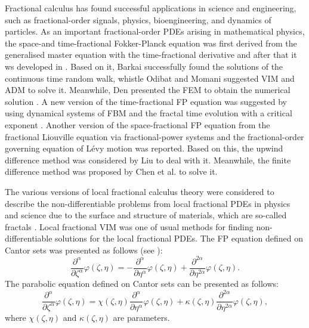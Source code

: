 \documentclass[10pt]{NSP1}
\begin{document}
Fractional calculus \cite{1,2,3,4,5,6,7,8,9} has found successful applications in science and
engineering, such as fractional-order signals, physics, bioengineering, and
dynamics of particles. As an important fractional-order PDEs arising
in mathematical physics, the space-and time-fractional Fokker-Planck
equation was first derived from the generalised master equation \cite {10} with
the time-fractional derivative and after that it ws developed in \cite {11}. Based
on it, Barkai \cite {12} successfully found the solutions of the continuous time
random walk, whistle Odibat and Momani \cite {13} suggested VIM and ADM to solve
it. Meanwhile, Den presented the FEM to obtain the numerical solution \cite {14}.
A new version of the time-fractional FP equation was suggested by using
dynamical systems of FBM \cite {15} and the fractal time evolution with a critical
exponent \cite {16}. Another version of the space-fractional FP equation from the
fractional Liouville equation via fractional-power systems \cite {17,18} and the
fractional-order governing equation of L\'{e}vy motion \cite {19} was reported.
Based on this, the upwind difference method was considered by Liu \cite {20} to
deal with it. Meanwhile, the finite difference method was proposed by Chen
et al. \cite {21} to solve it.

The various versions of local fractional calculus theory
\cite{22,23,24,25,26,27,28,29,30,31,32,33} were
considered to describe the non-differentiable problems from local fractional
PDEs in physics and science due to the surface and structure of materials,
which are so-called fractals \cite {34}. Local fractional VIM \cite {35,36} was one of
usual methods for finding non-differentiable solutions for the local
fractional PDEs. The FP equation defined on Cantor sets was presented as
follows (see \cite{37,38}):
\begin{equation}
\label{eq1}
\frac{\partial ^\alpha }{\partial \zeta ^\alpha }\varphi \left( {\zeta ,\eta
} \right)=-\frac{\partial ^\alpha }{\partial \eta ^\alpha }\varphi \left(
{\zeta ,\eta } \right)+\frac{\partial ^{2\alpha }}{\partial \eta ^{2\alpha
}}\varphi \left( {\zeta ,\eta } \right).
\end{equation}
The parabolic equation defined on Cantor sets can be presented as follows:
\begin{equation}
\label{eq2}
\frac{\partial ^\alpha }{\partial \zeta ^\alpha }\varphi \left( {\zeta ,\eta
} \right)=\chi \left( {\zeta ,\eta } \right)\frac{\partial ^\alpha
}{\partial \eta ^\alpha }\varphi \left( {\zeta ,\eta } \right)+\kappa \left(
{\zeta ,\eta } \right)\frac{\partial ^{2\alpha }}{\partial \eta ^{2\alpha
}}\varphi \left( {\zeta ,\eta } \right),
\end{equation}
where $\chi \left( {\zeta ,\eta } \right)$ and $\kappa \left( {\zeta ,\eta }
\right)$ are parameters.
\end{document}
